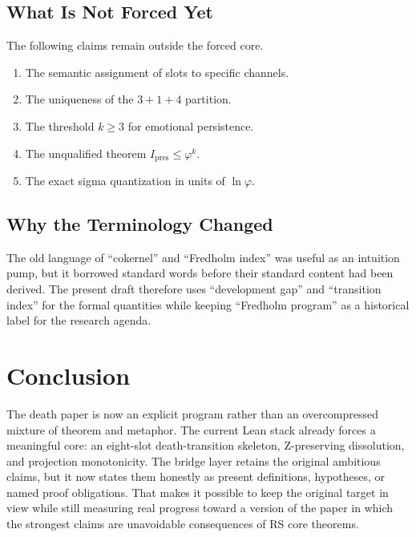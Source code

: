 \documentclass[11pt,a4paper]{article}
\theoremstyle{definition}
\newcommand{\phig}{\varphi}
\begin{document}
\subsection{What Is Not Forced Yet}

The following claims remain outside the forced core.

\begin{enumerate}
\item The semantic assignment of slots to specific channels.
\item The uniqueness of the $3+1+4$ partition.
\item The threshold $k \ge 3$ for emotional persistence.
\item The unqualified theorem $I_{\mathrm{pres}} \le \phig^k$.
\item The exact sigma quantization in units of $\ln \phig$.
\end{enumerate}

\subsection{Why the Terminology Changed}

The old language of ``cokernel'' and ``Fredholm index'' was useful as an
intuition pump, but it borrowed standard words before their standard content
had been derived.  The present draft therefore uses ``development gap'' and
``transition index'' for the formal quantities while keeping ``Fredholm
program'' as a historical label for the research agenda.

\section{Conclusion}
\label{sec:conclusion}

The death paper is now an explicit program rather than an overcompressed
mixture of theorem and metaphor.  The current Lean stack already forces a
meaningful core: an eight-slot death-transition skeleton, Z-preserving
dissolution, and projection monotonicity.  The bridge layer retains the
original ambitious claims, but it now states them honestly as present
definitions, hypotheses, or named proof obligations.  That makes it possible
to keep the original target in view while still measuring real progress
toward a version of the paper in which the strongest claims are unavoidable
consequences of RS core theorems.
\end{document}
